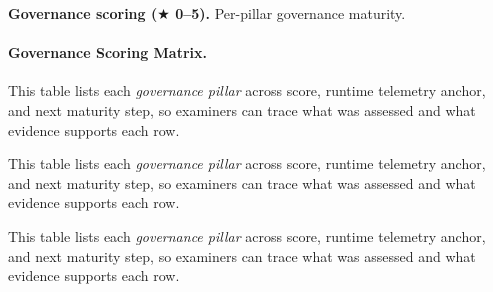 \noindent\textbf{Governance scoring ($\bigstar$ 0--5).} Per-pillar governance maturity.

\paragraph{Governance Scoring Matrix.}



\noindent This table lists each \textit{governance pillar} across score, runtime telemetry anchor, and next maturity step, so examiners can trace what was assessed and what evidence supports each row.



\noindent This table lists each \textit{governance pillar} across score, runtime telemetry anchor, and next maturity step, so examiners can trace what was assessed and what evidence supports each row.


\noindent This table lists each \textit{governance pillar} across score, runtime telemetry anchor, and next maturity step, so examiners can trace what was assessed and what evidence supports each row.



